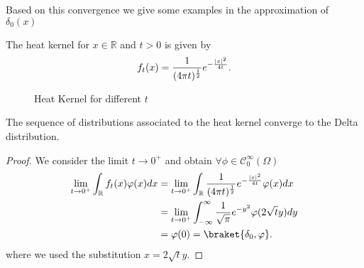 Based on this convergence we give some examples in the approximation of $\delta_0(x)$
\begin{example}
 The heat kernel for $x \in  \mathbb{R}$ and $t>0$ is given by
 \begin{align*}
   f_t(x) = \frac{1}{(4\pi t)^{\frac{1}{2}}} e^{-\frac{\lvert x\rvert^2}{4t}} 
 .\end{align*}
\begin{figure}[H]
  \begin{center}
  \end{center}
  \caption{Heat Kernel for different $t$}
\end{figure}
\end{example}
\begin{lemma}
  The sequence of distributions associated to the heat kernel converge to the Delta distribution.
\end{lemma}
\begin{proof}
 We consider the limit $t\to 0^+$  and obtain $\forall \phi  \in  \mathcal{C}_0^{\infty}(\Omega ) $
 \begin{align*}
   \lim_{t \to 0^+} \int_\mathbb{R} f_t(x) \phi(x) dx &= \lim_{t \to  0^+} \int_\mathbb{R} \frac{1}{(4\pi t)^{\frac{1}{2}} } e^{-\frac{\abs{x}^2}{4t}} \phi(x)dx\\
                                                   &= \lim_{t \to 0^+} \int_{-\infty}^{\infty} \frac{1}{\sqrt{\pi} }  e^{-y^2}  \phi(2 \sqrt{t}y) dy \\
                                                   &= \phi(0) = \braket{\delta_0,\phi }
 .\end{align*}
 where we used the substitution $x = 2\sqrt{t}y $. 
\end{proof}
